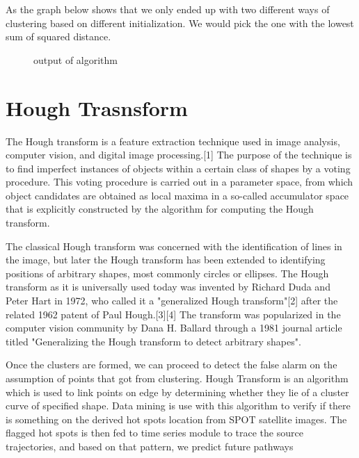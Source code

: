 \documentclass[12pt]{report}	%
\newcommand{\squeezeup}{\vspace{-0.6cm}}
\begin{document}
As the graph below shows that we only ended up with two different ways of clustering based on different initialization. We would pick the one with the lowest sum of squared distance.
\begin{figure}[!h]
	\captionsetup{font=scriptsize}
	\begin{center}
		\centerline{}
		\caption{output of algorithm}
		\label{fig:1}
	\end{center}
	\squeezeup
\end{figure}







 \newpage
\chapter{Hough Trasnsform}
The Hough transform is a feature extraction technique used in image analysis, computer vision, and digital image processing.[1] The purpose of the technique is to find imperfect instances of objects within a certain class of shapes by a voting procedure. This voting procedure is carried out in a parameter space, from which object candidates are obtained as local maxima in a so-called accumulator space that is explicitly constructed by the algorithm for computing the Hough transform.

The classical Hough transform was concerned with the identification of lines in the image, but later the Hough transform has been extended to identifying positions of arbitrary shapes, most commonly circles or ellipses. The Hough transform as it is universally used today was invented by Richard Duda and Peter Hart in 1972, who called it a "generalized Hough transform"[2] after the related 1962 patent of Paul Hough.[3][4] The transform was popularized in the computer vision community by Dana H. Ballard through a 1981 journal article titled "Generalizing the Hough transform to detect arbitrary shapes".

Once the clusters are formed, we can proceed to detect
the false alarm on the assumption of points that got
from clustering. Hough Transform is an algorithm
which is used to link points on edge by determining
whether they lie of a cluster curve of specified shape.
Data mining is use with this algorithm to verify if there
is something on the derived hot spots location from
SPOT satellite images. The flagged hot spots is then fed
to time series module to trace the source trajectories,
and based on that pattern, we predict future pathways
\end{document}

